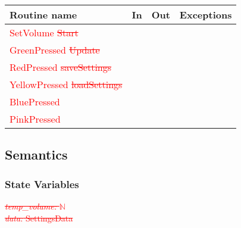 \documentclass[12pt]{article}
\begin{document}
\begin{tabular}{| l | l | l | l |}
\hline
\textbf{Routine name} & \textbf{In} & \textbf{Out} & \textbf{Exceptions}\\
\hline
\textcolor{red}{SetVolume \sout{Start}}    &      &           &          \\
\hline
\textcolor{red}{GreenPressed \sout{Update}}   &     &           &          \\
\hline
\textcolor{red}{RedPressed \sout{saveSettings}}    &          &     &          \\
\hline
\textcolor{red}{YellowPressed \sout{loadSettings}}   &          &     &          \\
\hline
\textcolor{red}{BluePressed}   &          &     &          \\
\hline
\textcolor{red}{PinkPressed}   &          &     &          \\
\hline
\end{tabular}

\subsection {Semantics}

\subsubsection {State Variables}
\textcolor{red}{\sout{\textit{temp\_volume:} $\mathbb{N}$}}\\
\textcolor{red}{\sout{\textit{data:} SettingsData}}
\end{document}
